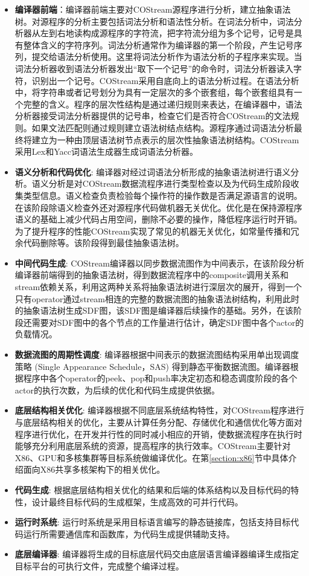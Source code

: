 \begin{itemize}	
  \item {\bf 编译器前端}：编译器前端主要对COStream源程序进行分析，建立抽象语法树。对源程序的分析主要包括词法分析和语法性分析。在词法分析中，词法分析器从左到右地读构成源程序的字符流，把字符流分组为多个记号，记号是具有整体含义的字符序列。词法分析通常作为编译器的第一个阶段，产生记号序列，提交给语法分析使用。这里将词法分析作为语法分析的子程序来实现。当词法分析器收到语法分析器发出“取下一个记号”的命令时，词法分析器读入字符，识别出一个记号。COStream采用自底向上的语法分析过程。在语法分析中，将字符串或者记号划分为具有一定层次的多个嵌套组，每个嵌套组具有一个完整的含义。程序的层次性结构是通过递归规则来表达，在编译器中，语法分析器接受词法分析器提供的记号串，检查它们是否符合COStream的文法规则。如果文法匹配则通过规则建立语法树结点结构。源程序通过词语法分析最终将建立为一种由顶层语法树节点表示的层次性抽象语法树结构。COStream采用Lex和Yacc词语法生成器生成词语法分析器。

  \item {\bf 语义分析和代码优化}: 编译器对经过词语法分析形成的抽象语法树进行语义分析。语义分析是对COStream数据流程序进行类型检查以及为代码生成阶段收集类型信息。语义检查负责检验每个操作符的操作数是否满足源语言的说明。在该阶段除语义检查外还对源程序代码做机器无关优化。优化是在保持源程序语义的基础上减少代码占用空间，删除不必要的操作，降低程序运行时开销。为了提升程序的性能COStream实现了常见的机器无关优化，如常量传播和冗余代码删除等。该阶段得到最佳抽象语法树。
  \item {\bf 中间代码生成}: COStream编译器以同步数据流图作为中间表示，在该阶段分析编译器前端得到的抽象语法树，得到数据流程序中的composite调用关系和stream依赖关系，利用这两种关系将抽象语法树进行深层次的展开，得到一个只有operator通过stream相连的完整的数据流图的抽象语法树结构，利用此时的抽象语法树生成SDF图，该SDF图是编译器后续操作的基础。另外，在该阶段还需要对SDF图中的各个节点的工作量进行估计，确定SDF图中各个actor的负载情况。
  \item {\bf 数据流图的周期性调度}: 编译器根据中间表示的数据流图结构采用单出现调度策略 (Single Appearance Schedule，SAS) 得到静态平衡数据流图。编译器根据程序中各个operator的peek、pop和push率决定初态和稳态调度阶段的各个actor的执行次数，为后续的优化和代码生成提供依据。
  \item {\bf 底层结构相关优化}: 编译器根据不同底层系统结构特性，对COStream程序进行与底层结构相关的优化，主要从计算任务分配、存储优化和通信优化等方面对程序进行优化，在开发并行性的同时减小相应的开销，使数据流程序在执行时能够充分利用底层系统的资源，提高程序的执行效率。COStream主要针对X86、GPU和多核集群等目标系统做编译优化。在第\ref{section:x86}节中具体介绍面向X86共享多核架构下的相关优化。
  \item {\bf 代码生成}: 根据底层结构相关优化的结果和后端的体系结构以及目标代码的特性，设计最终目标代码的生成框架，生成高效的可并行代码。
  \item {\bf 运行时系统}: 运行时系统是采用目标语言编写的静态链接库，包括支持目标代码运行所需要通信库和函数库，为代码生成提供辅助支持。
  \item {\bf 底层编译器}: 编译器将生成的目标底层代码交由底层语言编译器编译生成指定目标平台的可执行文件，完成整个编译过程。
  
\end{itemize}

